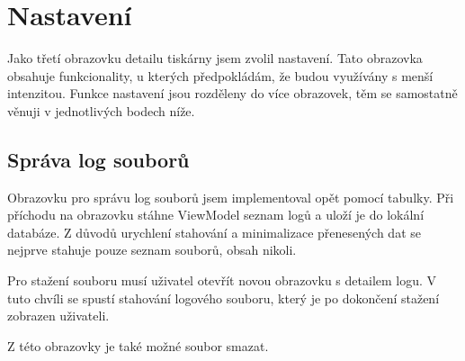 \section{Nastavení}

Jako třetí obrazovku detailu tiskárny jsem zvolil nastavení.
Tato obrazovka obsahuje funkcionality, u kterých předpokládám, že budou využívány s menší intenzitou.
Funkce nastavení jsou rozděleny do více obrazovek, těm se samostatně věnuji v jednotlivých bodech níže.

\subsection{Správa log souborů}

Obrazovku pro správu log souborů jsem implementoval opět pomocí tabulky.
Při příchodu na obrazovku stáhne ViewModel seznam logů a uloží je do lokální databáze.
Z důvodů urychlení stahování a minimalizace přenesených dat se nejprve stahuje pouze seznam souborů, obsah nikoli.

Pro stažení souboru musí uživatel otevřít novou obrazovku s detailem logu.
V tuto chvíli se spustí stahování logového souboru, který je po dokončení stažení zobrazen uživateli.

Z této obrazovky je také možné soubor smazat.
